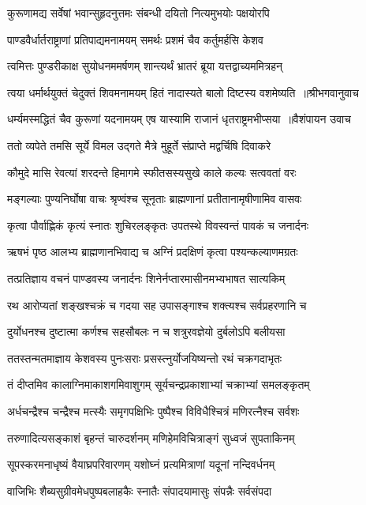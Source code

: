 \twolineshloka
{कुरूणामद्य सर्वेषां भवान्सुहृदनुत्तमः}
{संबन्धी दयितो नित्यमुभयोः पक्षयोरपि}


\twolineshloka
{पाण्डवैर्धार्तराष्ट्राणां प्रतिपाद्यमनामयम्}
{समर्थः प्रशमं चैव कर्तुमर्हसि केशव}


\twolineshloka
{त्वमित्तः पुण्डरीकाक्ष सुयोधनममर्षणम्}
{शान्त्यर्थं भ्रातरं ब्रूया यत्तद्वाच्यममित्रहन्}


\threelineshloka
{त्वया धर्मार्थयुक्तं चेदुक्तं शिवमनामयम्}
{हितं नादास्यते बालो दिष्टस्य वशमेष्यति ॥श्रीभगवानुवाच}
{}


\threelineshloka
{धर्म्यमस्मद्धितं चैव कुरूणां यदनामयम्}
{एष यास्यामि राजानं धृतराष्ट्रमभीप्सया ॥वैशंपायन उवाच}
{}


\twolineshloka
{ततो व्यपेते तमसि सूर्ये विमल उद्गते}
{मैत्रे मुहूर्ते संप्राप्ते मद्वर्चिषि दिवाकरे}


\twolineshloka
{कौमुदे मासि रेवत्यां शरदन्ते हिमागमे}
{स्फीतसस्यसुखे काले कल्यः सत्ववतां वरः}


\twolineshloka
{मङ्गल्याः पुण्यनिर्घोषा वाचः श्रृण्वंश्च सूनृताः}
{ब्राह्मणानां प्रतीतानामृषीणामिव वासवः}


\twolineshloka
{कृत्वा पौर्वाह्णिकं कृत्यं स्नातः शुचिरलङ्कृतः}
{उपतस्थे विवस्वन्तं पावकं च जनार्दनः}


\twolineshloka
{ऋषभं पृष्ठ आलभ्य ब्राह्मणानभिवाद्य च}
{अग्निं प्रदक्षिणं कृत्वा पश्यन्कल्याणमग्रतः}


\twolineshloka
{तत्प्रतिज्ञाय वचनं पाण्डवस्य जनार्दनः}
{शिनेर्नप्तारमासीनमभ्यभाषत सात्यकिम्}


\twolineshloka
{रथ आरोप्यतां शङ्खश्चक्रं च गदया सह}
{उपासङ्गाश्च शक्त्यश्च सर्वप्रहरणानि च}


\twolineshloka
{दुर्योधनश्च दुष्टात्मा कर्णश्च सहसौबलः}
{न च शत्रुरवज्ञेयो दुर्बलोऽपि बलीयसा}


\twolineshloka
{ततस्तन्मतमाज्ञाय केशवस्य पुनःसराः}
{प्रसस्त्नुर्योजयिष्यन्तो रथं चक्रगदाभृतः}


\twolineshloka
{तं दीप्तमिव कालाग्निमाकाशगमिवाशुगम्}
{सूर्यचन्द्रप्रकाशाभ्यां चक्राभ्यां समलङ्कृतम्}


\twolineshloka
{अर्धचन्द्रैश्च चन्द्रैश्च मत्स्यैः समृगपक्षिभिः}
{पुष्पैश्च विविधैश्चित्रं मणिरत्नैश्च सर्वशः}


\twolineshloka
{तरुणादित्यसङ्काशं बृहन्तं चारुदर्शनम्}
{मणिहेमविचित्राङ्गं सुध्वजं सुपताकिनम्}


\twolineshloka
{सूपस्करमनाधृष्यं वैयाघ्रपरिवारणम्}
{यशोघ्नं प्रत्यमित्राणां यदूनां नन्दिवर्धनम्}


\twolineshloka
{वाजिभिः शैब्यसुग्रीवमेधपुष्पबलाहकैः}
{स्नातैः संपादयामासुः संपन्नैः सर्वसंपदा}


